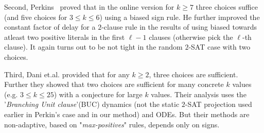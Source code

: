 \documentclass[11pt,reqno]{amsart}
\numberwithin{equation}{section}
\begin{document}
	Second, Perkins~\cite{Perkins} proved that in the online version for $k\ge 7$ three choices suffice (and five choices for $3\le k\le 6$) using a biased sign rule.
	He further improved the constant factor of delay for a $2$-clause rule in the results of \cite{SV} using biased towards atleast two positive literals in the first $\ell-1$ clauses (otherwise pick the $\ell$-th clause).
	It again turns out to be not tight in the random $2$-SAT case with two choices.
	
	Third, Dani et.al.\cite{DDHM} provided that for any $k\geq 2$, three choices are sufficient.
	Further they showed that two choices are sufficient for many concrete $k$ values (e.g. $3\leq k\leq 25$) with a conjecture for large $k$ values.
	Their analysis uses the '\emph{Branching Unit clause}'(BUC) dynamics (not the static $2$-SAT projection used earlier in Perkin's case and in our method) and ODEs.
	But their methods are non-adaptive, based on "\emph{max-positives}" rules, depends only on signs.
	
\end{document}
